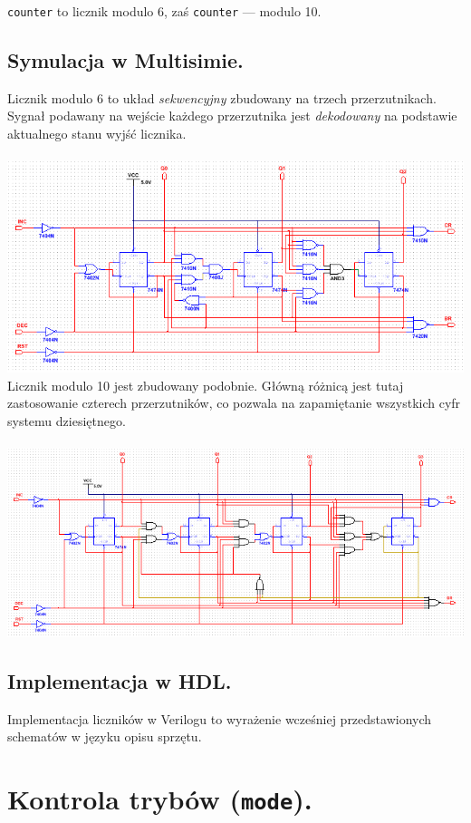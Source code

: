 \documentclass[a4paper,oneside]{report}
\newcommand{\counter}[1]{\texttt{counter\textunderscore #1}}
\newcommand{\mode}{\texttt{mode}}
\begin{document}
\counter{6} to licznik modulo 6, zaś \counter{10} --- modulo 10.
\subsection{Symulacja w Multisimie.}
Licznik modulo 6 to układ \emph{sekwencyjny} zbudowany na trzech
przerzutnikach. Sygnał podawany na wejście każdego przerzutnika jest
\emph{dekodowany} na podstawie aktualnego stanu wyjść licznika.
\\ \\
\includegraphics[width=\textwidth]{multisim/counter6.png}
Licznik modulo 10 jest zbudowany podobnie. Główną różnicą jest tutaj
zastosowanie czterech przerzutników, co pozwala na zapamiętanie
wszystkich cyfr systemu dziesiętnego.
\\ \\
\includegraphics[width=\textwidth]{multisim/counter10.png}
\subsection{Implementacja w HDL.}
Implementacja liczników w Verilogu to wyrażenie wcześniej
przedstawionych schematów w języku opisu sprzętu.



\section{Kontrola trybów (\mode).}
\end{document}
